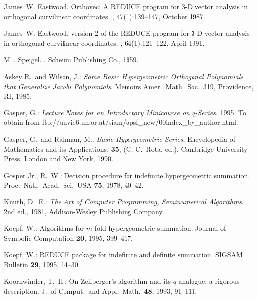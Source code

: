\begin{thebibliography}{999}

James~W. Eastwood.
\newblock Orthovec: A {REDUCE} program for {3-D} vector analysis in orthogonal
  curvilinear coordinates.
, 47(1):139--147, October 1987.

James~W. Eastwood.
 version 2 of the {REDUCE} program for {3-D} vector
  analysis in orthogonal curvilinear coordinates.
, 64(1):121--122, April 1991.

M~. Speigel.
.
\newblock Scheum Publishing Co., 1959.


Askey R.\ and Wilson, J.:
{\sl Some Basic Hypergeometric Orthogonal Polynomials that Generalize Jacobi
Polynomials}. Memoirs Amer.\ Math.\ Soc.\ 319, Providence, RI, 1985.

Gasper, G.:
{\sl Lecture Notes for an Introductory Minicourse on $q$-Series}.
1995. To obtain from  
ftp://unvie6.un.or.at/siam/opsf\_new/\linebreak 00index\_by\_author.html.

Gasper, G.\ and Rahman, M.:
{\sl Basic Hypergeometric Series},
Encyclopedia of Mathematics and its Applications, 
\textbf{35}, (G.-C.\ Rota, ed.), Cambridge University Press,
London and New York, 1990.

Gosper Jr., R.\ W.:
Decision procedure for indefinite hypergeometric
summation. Proc.\ Natl.\ Acad.\ Sci.\ USA \textbf{75}, 1978, 40--42.

Knuth, D.\ E.:
{\sl The Art of Computer Programming, Seminumerical Algorithms}.
2nd ed., 1981, Addison-Wesley Publishing Company.

Koepf, W.:
Algorithms for $m$-fold hypergeometric summation.
Journal of Symbolic Computation \textbf{20}, 1995, 399--417.

Koepf, W.:
REDUCE package for indefinite and definite summation.
SIGSAM Bulletin \textbf{29}, 1995, 14--30.

Koornwinder, T.\ H.:
On Zeilberger's algorithm and its $q$-analogue: a rigorous description.
J.\ of Comput.\ and Appl.\ Math.\ \textbf{48}, 1993, 91--111.


\end{thebibliography}
